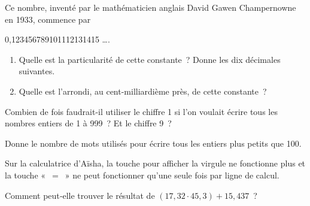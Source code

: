 \begin{enigme}

Ce nombre, inventé par le mathématicien anglais David Gawen Champernowne en 1933, commence par

0,123456789101112131415 \ldots . \\[-1em]
\begin{enumerate}
 \item Quelle est la particularité de cette constante ? Donne les dix décimales suivantes.
 \item Quelle est l'arrondi, au cent-milliardième près, de cette constante ?
 \end{enumerate}
 \end{enigme}
        
\vspace*{2em}
        
\begin{enigme}[Défis]
Combien de fois faudrait-il utiliser le chiffre 1 si l'on voulait écrire tous les nombres entiers de 1 à 999 ? Et le chiffre 9 ?

Donne le nombre de mots utilisés pour écrire tous les entiers plus petits que 100.
 \end{enigme} 
 
 \vspace*{2em}

\begin{enigme}
Sur la calculatrice d'Aïsha, la touche pour afficher la virgule ne fonctionne plus et la touche « $=$ » ne peut fonctionner qu'une seule fois par ligne de calcul.

Comment peut‑elle trouver le résultat de $(17,32 \cdot 45,3) + 15,437$ ?
 \end{enigme} 
 
 \vspace*{2em}

